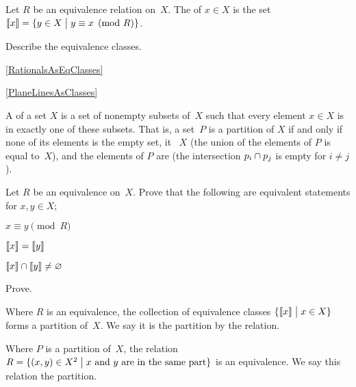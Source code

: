 \documentclass{ibl}
\begin{document}
\begin{df}
Let $R$ be an equivalence relation on~$X$.
The  of $x\in X$ is the set
$\llbracket x \rrbracket=\{y\in X \bigm| y\equiv x\pmod R\}$.   
\end{df}

\begin{ex} Describe the equivalence classes.
\begin{exes}
\item \cref{RationalsAsEqClasses}
\item \cref{PlaneLinesAsClasses}
\end{exes}
\end{ex}

\begin{df}
A  of a set $X$ is a 
set of nonempty subsets of~$X$ such that every element $x\in X$ 
is in exactly one of these subsets.
That is, a set~$P$ is a partition of $X$ if and only if 
none of its elements is the empty set,
it ~$X$
(the union of the elements of $P$ is equal to~$X$),
and the elements of $P$ are 
(the intersection $p_i\cap p_j$ is empty for $i\neq j$).
\end{df}

\begin{center}
\end{center}

\begin{ex} Let $R$ be an equivalence on~$X$.
Prove that the following are equivalent statements for $x,y\in X$;
\begin{exes}
\item $x\equiv y\pmod R$
\item $\llbracket x \rrbracket=\llbracket y \rrbracket$    
\item $\llbracket x \rrbracket\cap\llbracket y \rrbracket\neq \varnothing$
\end{exes}
\end{ex}

\begin{ex} Prove.
\begin{exes}
\item Where $R$ is an equivalence, 
  the collection of equivalence classes 
  $\{\llbracket x \rrbracket \bigm| x\in X\}$ forms a partition of~$X$.
  We say it is the partition  by the relation.
\item Where $P$ is a partition of~$X$, 
  the relation $R=\{(x,y)\in X^2 \bigm| \text{$x$ and~$y$ are in the same part}\}$ 
  is an equivalence.
  We say this relation  the partition. 
\end{exes}
\end{ex}
\end{document}
